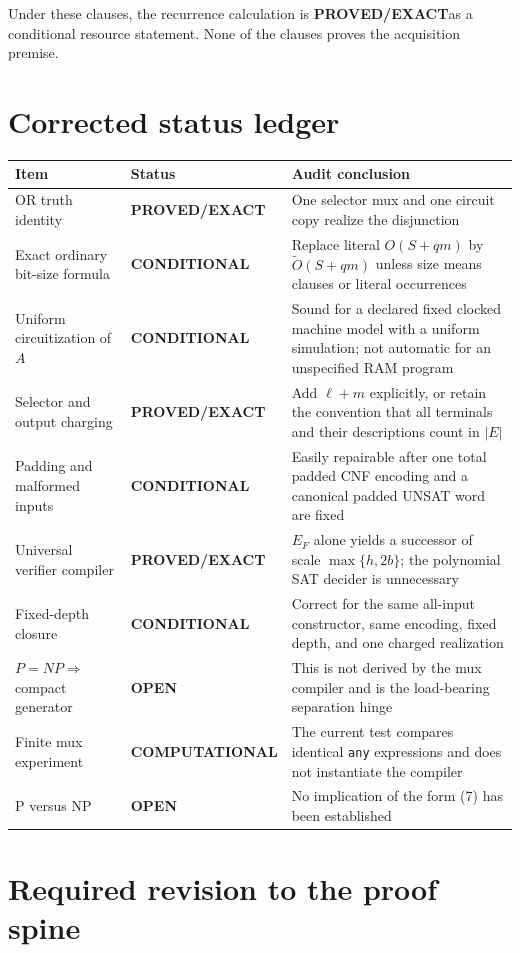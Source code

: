 \documentclass[11pt]{article}
\newcommand{\EXACT}{\textcolor{exact}{\textbf{PROVED/EXACT}}}
\newcommand{\COND}{\textcolor{conditional}{\textbf{CONDITIONAL}}}
\newcommand{\COMP}{\textcolor{conditional}{\textbf{COMPUTATIONAL}}}
\newcommand{\OPEN}{\textcolor{openstatus}{\textbf{OPEN}}}
\begin{document}
Under these clauses, the recurrence calculation is \EXACT as a conditional
resource statement.  None of the clauses proves the acquisition premise.

\section{Corrected status ledger}

\begin{center}
{\small
\begin{tabularx}{\textwidth}{@{}p{}p{}X@{}}
\toprule
Item & Status & Audit conclusion \\
\midrule
OR truth identity & \EXACT & One selector mux and one circuit copy realize
the disjunction \\
Exact ordinary bit-size formula & \COND & Replace literal $O(S+qm)$ by
$\widetilde O(S+qm)$ unless size means clauses or literal occurrences \\
Uniform circuitization of $A$ & \COND & Sound for a declared fixed clocked
machine model with a uniform simulation; not automatic for an unspecified
RAM program \\
Selector and output charging & \EXACT & Add $\ell+m$ explicitly, or retain
the convention that all terminals and their descriptions count in $|E|$ \\
Padding and malformed inputs & \COND & Easily repairable after one total
padded CNF encoding and a canonical padded UNSAT word are fixed \\
Universal verifier compiler & \EXACT & $E_F$ alone yields a successor of scale
$\max\{h,2b\}$; the polynomial SAT decider is unnecessary \\
Fixed-depth closure & \COND & Correct for the same all-input constructor,
same encoding, fixed depth, and one charged realization \\
$P=NP\Rightarrow$ compact generator & \OPEN & This is not derived by the mux
compiler and is the load-bearing separation hinge \\
Finite mux experiment & \COMP & The current test compares identical
\texttt{any} expressions and does not instantiate the compiler \\
P versus NP & \OPEN & No implication of the form (7) has been established \\
\bottomrule
\end{tabularx}
}
\end{center}

\section{Required revision to the proof spine}
\end{document}
